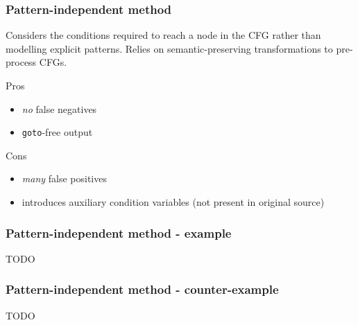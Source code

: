 \documentclass[aspectratio=1610]{beamer}
\begin{document}
\begin{frame}
	\frametitle{Pattern-independent method}

	Considers the conditions required to reach a node in the CFG rather than modelling explicit patterns. Relies on semantic-preserving transformations to pre-process CFGs.

	\vspace*{2em}

	\begin{block}{Pros}
		\begin{itemize}
			\item \textit{no} false negatives
			\item \texttt{goto}-free output
		\end{itemize}
	\end{block}

	\begin{block}{Cons}
		\begin{itemize}
			\item \textit{many} false positives
			\item introduces auxiliary condition variables (not present in original source)
		\end{itemize}
	\end{block}




\end{frame}

\begin{frame}
	\frametitle{Pattern-independent method - example}

	TODO
\end{frame}

\begin{frame}
	\frametitle{Pattern-independent method - counter-example}

	TODO
\end{frame}

\end{document}

